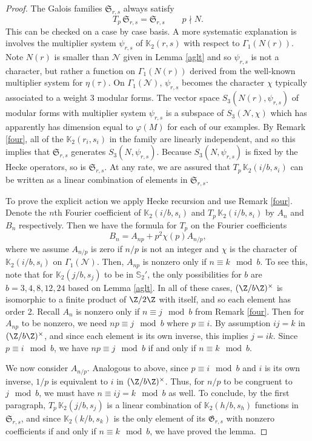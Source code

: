 \documentclass[12pt]{amsart}
\theoremstyle{definition}
\theoremstyle{remark}
\begin{document}
\begin{proof}
 The Galois families $\mathfrak{S}_{r,s}$  always satisfy $$T_p\,\mathfrak{S}_{r,s}=\mathfrak{S}_{r,s}\quad\quad p\nmid N.$$ This can be checked on a case by case basis. A more systematic explanation is involves the multiplier system $\psi_{r,s}$ of $\mathbb{K}_2(r,s)$ with respect to $\Gamma_1(N(r))$. Note $N(r)$ is smaller than $\mathcal{N}$ given in Lemma \ref{aglt} and so $\psi_{r,s}$ is not a character, but rather a function on $\Gamma_1(N(r))$ derived from the well-known multiplier system for $\eta(\tau)$. On $\Gamma_1(\mathcal{N})$, $\psi_{r,s}$ becomes the character $\chi$ typically associated to a weight 3 modular forms. The vector space $S_3(N(r),\psi_{r,s})$ of modular forms with multiplier system $\psi_{r,s}$ is a subspace of $S_3(\mathcal{N},\chi)$ which has apparently has dimension equal to $\varphi(M)$ for each of our examples. By Remark \ref{four}, all of the $\mathbb{K}_2(r_i,s_i)$ in the family are linearly independent, and so this implies that $\mathfrak{S}_{r,s}$ generates $S_3(N,\psi_{r,s})$. Because  $S_3(N,\psi_{r,s})$ is fixed by the Hecke operators, so is $\mathfrak{S}_{r,s}$. At any rate, we are assured that $T_p\, \mathbb{K}_2(i/b,s_i)$ can be written as a linear combination of elements in $\mathfrak {S}_{r,s}.$
  
  To prove the explicit action we apply Hecke recursion and use Remark \ref{four}. Denote the $n$th Fourier coefficient of $\mathbb{K}_2(i/b,s_i)$ and $T_p\, \mathbb{K}_2(i/b,s_i)$ by $A_n$ and $B_n$ respectively. Then we have the formula   for $T_p$ on the Fourier coefficients $$B_n=A_{np}+p^2 \chi(p)A_{n/p},$$
   where we assume $A_{n/p}$ is zero if $n/p$ is not an integer and $\chi$ is the character of $\mathbb{K}_2(i/b,s_i)$ on $\Gamma_1(\mathcal{N})$. Then, $A_{np}$ is nonzero only if $n\equiv k\mod b$. To see this, note that for $\mathbb{K}_2(j/b,s_j)$ to be in $\mathbb S_2'$, the only possibilities for $b$ are $b=3,4,8,12,24$ based on Lemma \ref{aglt}. In all of these cases, $(\Z/b\Z)^\times$ is isomorphic to a finite product of $\Z/2\Z$ with itself, and so each element has order 2. Recall $A_n$ is nonzero only if $n\equiv j\mod b$ from Remark \ref{four}. Then for $A_{np}$ to be nonzero, we need $np\equiv j\mod b$ where $p\equiv i$. By assumption $ij=k$ in $(\Z/b\Z)^\times$, and since each element is its own inverse, this implies $j=ik$. Since $p\equiv i\mod b$, we have $np\equiv j\mod b$ if and only if $n\equiv k\mod b$. 
   
We now consider $A_{n/p}$. Analogous to above, since $p\equiv i\mod b$ and $i$ is its own inverse, $1/p$ is equivalent to $i$ in $(\Z/b\Z)^\times$. Thus, for $n/p$ to be congruent to $j\mod b$, we must have $n\equiv ij=k\mod b$ as well. To conclude, by the first paragraph, $T_p\, \mathbb{K}_2(j/b,s_j)$ is a linear combination of $\mathbb{K}_2(h/b,s_h)$ functions in $\mathfrak{S}_{r,s}$, and since $\mathbb{K}_2(k/b,s_k)$ is the only element of its $\mathfrak{G}_{r,s}$ with nonzero coefficients if and only if $n\equiv k\mod b$, we have proved the lemma. 
\end{proof}
\end{document}
